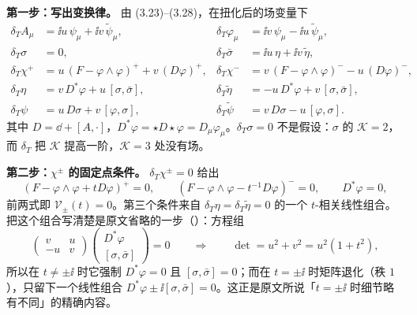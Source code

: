 \textbf{第一步：写出变换律。} 由 (3.23)–(3.28)，在扭化后的场变量下\pA{}
\begin{equation}
\begin{aligned}
\delta_T A_\mu&=\ii u\,\psi_\mu+\ii v\,\tilde\psi_\mu, &
\delta_T\varphi_\mu&=\ii v\,\psi_\mu-\ii u\,\tilde\psi_\mu,\\
\delta_T\sigma&=0, &
\delta_T\bar\sigma&=\ii u\,\eta+\ii v\,\tilde\eta,\\
\delta_T\chi^{+}&=u\,(F-\varphi\wedge\varphi)^{+}+v\,(D\varphi)^{+}, &
\delta_T\chi^{-}&=v\,(F-\varphi\wedge\varphi)^{-}-u\,(D\varphi)^{-},\\
\delta_T\eta&=v\,D^*\varphi+u\,[\sigma,\bar\sigma], &
\delta_T\tilde\eta&=-u\,D^*\varphi+v\,[\sigma,\bar\sigma],\\
\delta_T\psi&=u\,D\sigma+v\,[\varphi,\sigma], &
\delta_T\tilde\psi&=v\,D\sigma-u\,[\varphi,\sigma].
\end{aligned}
\label{eq:transforms}
\end{equation}
其中 $D=\dd+[A,\cdot]$，$D^*\varphi=\star D\star\varphi=D_\mu\varphi_\mu$。$\delta_T\sigma=0$ 不是假设：$\sigma$ 的 $\mathcal K=2$，而 $\delta_T$ 把 $\mathcal K$ 提高一阶，$\mathcal K=3$ 处没有场\pA{}。

\textbf{第二步：$\chi^{\pm}$ 的固定点条件。} $\delta_T\chi^{\pm}=0$ 给出
\begin{equation}
(F-\varphi\wedge\varphi+tD\varphi)^{+}=0,
\qquad
(F-\varphi\wedge\varphi-t^{-1}D\varphi)^{-}=0,
\qquad
D^*\varphi=0,
\label{eq:fixed}
\end{equation}
前两式即 $\mathcal V_\pm(t)=0$。第三个条件来自 $\delta_T\eta=\delta_T\tilde\eta=0$ 的一个 $t$-相关线性组合\pA{}。把这个组合写清楚是原文省略的一步（\pB）：方程组
\begin{equation}
\begin{pmatrix}v&u\\-u&v\end{pmatrix}
\begin{pmatrix}D^*\varphi\\ [\sigma,\bar\sigma]\end{pmatrix}=0
\qquad\Longrightarrow\qquad
\det=u^2+v^2=u^2(1+t^2),
\label{eq:etaMatrix}
\end{equation}
所以在 $t\ne\pm\ii$ 时它强制 $D^*\varphi=0$ 且 $[\sigma,\bar\sigma]=0$；而在 $t=\pm\ii$ 时矩阵退化（秩 $1$），只留下一个线性组合 $D^*\varphi\pm\ii[\sigma,\bar\sigma]=0$。这正是原文所说「$t=\pm\ii$ 时细节略有不同」的精确内容\pA{}。

